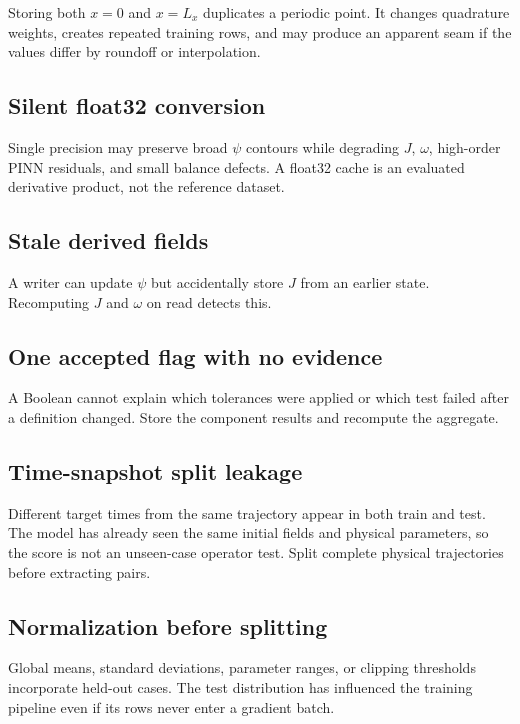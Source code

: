 \documentclass[11pt]{article}
\begin{document}
Storing both $x=0$ and $x=L_x$ duplicates a periodic point. It changes quadrature weights, creates repeated training rows, and may produce an apparent seam if the values differ by roundoff or interpolation.

\subsection{Silent float32 conversion}

Single precision may preserve broad $\psi$ contours while degrading $J$, $\omega$, high-order PINN residuals, and small balance defects. A float32 cache is an evaluated derivative product, not the reference dataset.

\subsection{Stale derived fields}

A writer can update $\psi$ but accidentally store $J$ from an earlier state. Recomputing $J$ and $\omega$ on read detects this.

\subsection{One accepted flag with no evidence}

A Boolean cannot explain which tolerances were applied or which test failed after a definition changed. Store the component results and recompute the aggregate.

\subsection{Time-snapshot split leakage}

Different target times from the same trajectory appear in both train and test. The model has already seen the same initial fields and physical parameters, so the score is not an unseen-case operator test. Split complete physical trajectories before extracting pairs.

\subsection{Normalization before splitting}

Global means, standard deviations, parameter ranges, or clipping thresholds incorporate held-out cases. The test distribution has influenced the training pipeline even if its rows never enter a gradient batch.
\end{document}
